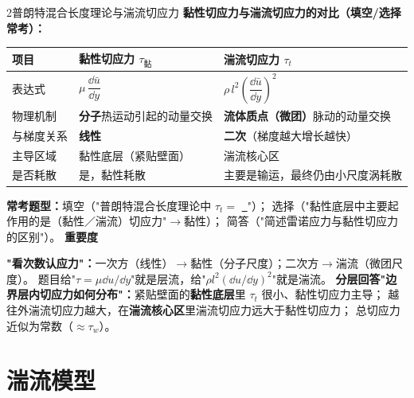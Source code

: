 \begin{kaodian}{2}{普朗特混合长度理论与湍流切应力}
\textbf{黏性切应力与湍流切应力的对比（填空/选择常考）：}
\begin{center}
\begin{tabularx}{\textwidth}{@{}lXX@{}}
\toprule
项目 & 黏性切应力 $\tau_{\text{黏}}$ & 湍流切应力 $\tau_t$ \\
\midrule
表达式 & $\mu\,\dfrac{\dd \bar u}{\dd y}$ & $\rho\,l^2\left(\dfrac{\dd \bar u}{\dd y}\right)^2$ \\
物理机制 & \textbf{分子}热运动引起的动量交换 & \textbf{流体质点（微团）}脉动的动量交换 \\
与梯度关系 & \textbf{线性} & \textbf{二次}（梯度越大增长越快） \\
主导区域 & 黏性底层（紧贴壁面） & 湍流核心区 \\
是否耗散 & 是，黏性耗散 & 主要是输运，最终仍由小尺度涡耗散 \\
\bottomrule
\end{tabularx}
\end{center}

\textbf{常考题型：}填空（"普朗特混合长度理论中 $\tau_t=$ \underline{\ }"）；
选择（"黏性底层中主要起作用的是（黏性／湍流）切应力"$\to$黏性）；
简答（"简述雷诺应力与黏性切应力的区别"）。
\textbf{重要度 }\quad{}\quad{}

\begin{banfa}
\textbf{"看次数认应力"：}一次方（线性）$\to$黏性（分子尺度）；二次方$\to$湍流（微团尺度）。
题目给"$\tau=\mu\dd u/\dd y$"就是层流，给"$\rho l^2(\dd u/\dd y)^2$"就是湍流。
\textbf{分层回答"边界层内切应力如何分布"：}紧贴壁面的\textbf{黏性底层}里 $\tau_t$ 很小、黏性切应力主导；
越往外湍流切应力越大，在\textbf{湍流核心区}里湍流切应力远大于黏性切应力；
总切应力近似为常数（$\approx\tau_w$）。
\end{banfa}
\end{kaodian}

\section{湍流模型}

